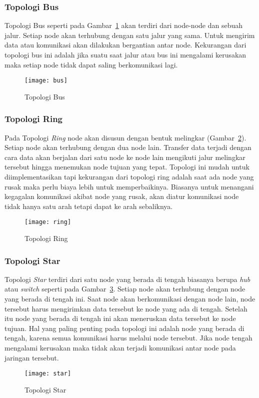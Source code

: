 \subsubsection{Topologi Bus}
Topologi Bus seperti pada Gambar~\ref{fig:bus} akan terdiri dari node-node dan sebuah jalur. Setiap node akan terhubung dengan satu jalur yang sama. Untuk mengirim data atau komunikasi akan dilakukan bergantian antar node. Kekurangan dari topologi bus ini adalah jika suatu saat jalur atau bus ini mengalami kerusakan maka setiap node tidak dapat saling berkomunikasi lagi.
\begin{figure} [H]
	\centering  
	\texttt{[image: bus]}  
	\caption[Topologi Bus]{Topologi Bus} 
	\label{fig:bus} 
\end{figure} 

\subsubsection{Topologi Ring}
Pada Topologi \textit{Ring} node akan disusun dengan bentuk melingkar (Gambar~\ref{fig:ring}). Setiap node akan terhubung dengan dua node lain. Transfer data terjadi dengan cara data akan berjalan dari satu node ke node lain mengikuti jalur melingkar tersebut hingga menemukan node tujuan yang tepat. Topologi ini mudah untuk diimplementasikan tapi kekurangan dari topologi ring adalah saat ada node yang rusak maka perlu biaya lebih untuk memperbaikinya. Biasanya untuk menangani kegagalan komunikasi akibat node yang rusak, akan diatur komunikasi node tidak hanya satu arah tetapi dapat ke arah sebaliknya.
\begin{figure} [H]
	\centering  
	\texttt{[image: ring]}  
	\caption[Topologi Ring]{Topologi Ring} 
	\label{fig:ring} 
\end{figure} 

\subsubsection{Topologi Star}
Topologi \textit{Star} terdiri dari satu node yang berada di tengah biasanya berupa \textit{hub} atau \textit{switch} seperti pada Gambar~\ref{fig:star}. Setiap node akan terhubung dengan node yang berada di tengah ini. Saat node akan berkomunikasi dengan node lain, node tersebut harus mengirimkan data tersebut ke node yang ada di tengah. Setelah itu node yang berada di tengah ini akan meneruskan data tersebut ke node tujuan. Hal yang paling penting pada topologi ini adalah node yang berada di tengah, karena semua komunikasi harus melalui node tersebut. Jika node tengah mengalami kerusakan maka tidak akan terjadi komunikasi antar node pada jaringan tersebut.
\begin{figure} [H]
	\centering  
	\texttt{[image: star]}  
	\caption[Topologi Star]{Topologi Star} 
	\label{fig:star} 
\end{figure} 

